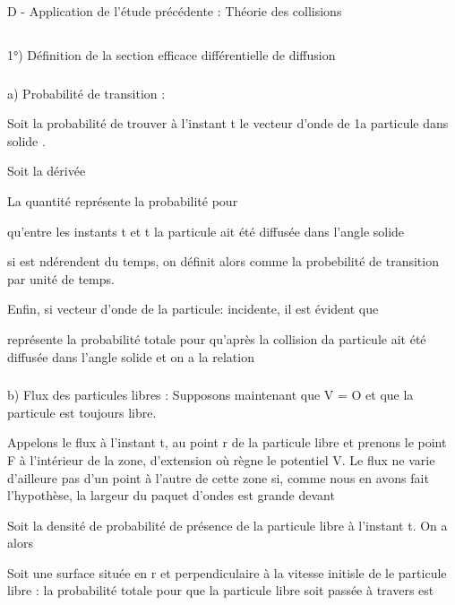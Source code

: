{{{\section{}%
D - Application de l'étude précédente : Théorie des collisions
\subsection{}%
1°) Définition de la section efficace différentielle de diffusion

\subsubsection{}%
a) Probabilité de transition :

Soit  la probabilité de trouver à l'instant t le
vecteur d'onde de 1a particule dans  solide .

Soit  la dérivée 

La quantité  représente la probabilité pour

qu'entre les instants t et t  la particule ait été diffusée dans
l'angle solide 

si  est ndérendent du temps, on définit alors 
comme la probebilité  de transition par unité de temps.

Enfin, si  vecteur d'onde de la particule: incidente, il
est évident que 

 représente la probabilité totale pour qu'après
la collision da particule ait été diffusée dans l'angle solide 
et on a la relation


\subsubsection{}%
b) Flux des particules libres :
Supposons maintenant que V = O et que la particule est
toujours libre.

 Appelons le flux à l'instant t, au point r de la
particule libre et prenons le point F à l'intérieur de la zone, d'extension
où règne le potentiel V. Le flux  ne varie d'ailleure pas
d'un point à l'autre de cette zone si, comme nous en avons fait l'hypothèse,
la largeur du paquet d'ondes est grande devant

Soit  la densité de probabilité de présence de la
particule libre  à l'instant t. On a alors

Soit  une surface située en r et perpendiculaire à la vitesse initisle
de le particule libre : la probabilité totale pour que la particule
libre soit passée à travers  est

}}}
